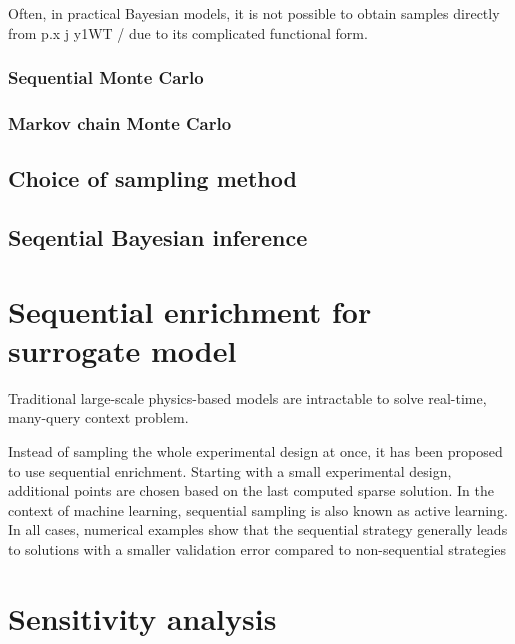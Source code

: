 Often, in practical Bayesian models, it is not possible to obtain samples directly from p.x j y1WT / due to its complicated functional form.

\subsubsection{Sequential Monte Carlo}


\subsubsection{Markov chain Monte Carlo}



\subsection{Choice of sampling method}


\subsection{Seqential Bayesian inference}


\section{Sequential enrichment for surrogate model}

Traditional large-scale physics-based models are intractable to solve real-time, many-query context problem. 


Instead of sampling the whole experimental design at once, it has been proposed to use sequential enrichment. Starting with
a small experimental design, additional points are chosen based on the last computed sparse
solution. In the context of machine learning, sequential sampling is also known as active learning.  In all cases, numerical examples show that the sequential strategy generally leads to solutions with
a smaller validation error compared to non-sequential strategies

\section{Sensitivity analysis}